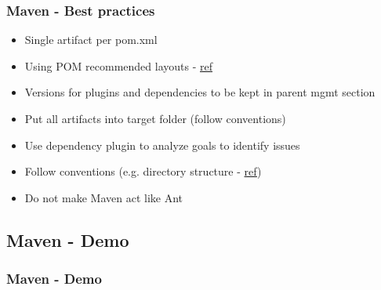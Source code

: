 \begin{frame}
\frametitle{Maven - Best practices}
\begin{itemize}
	\item Single artifact per pom.xml
	\item Using POM recommended layouts - \href{https://maven.apache.org/pom.html}{ref}
	\item Versions for plugins and dependencies to be kept in parent mgmt section
	\item Put all artifacts into target folder (follow conventions)
	\item Use dependency plugin to analyze goals to identify issues
	\item Follow conventions (e.g. directory structure - \href{https://maven.apache.org/guides/introduction/introduction-to-the-standard-directory-layout.html}{ref})
	\item Do not make Maven act like Ant
\end{itemize}
\end{frame}

\subsection[]{Maven - Demo}
\begin{frame}
\frametitle{Maven - Demo}
\end{frame}








